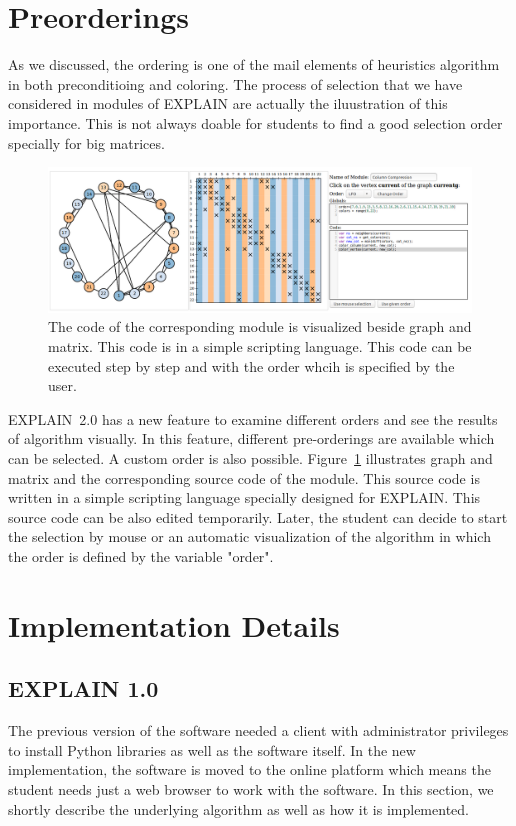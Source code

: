 \documentclass[12pt, oneside]{book}
\begin{document}
\section{Preorderings}
As we discussed, the ordering is one of the mail elements of heuristics algorithm
in both preconditioing and coloring. The process of selection that we have
considered in modules of \mbox{EXPLAIN} are actually the iluustration of this importance.
This is not always doable for students to find a good selection order specially for
big matrices.
\begin{figure}
\centering
\includegraphics[width=\textwidth]{custom_module}
\caption{The code of the corresponding module is visualized beside 
graph and matrix. This code is in a simple scripting language. 
This code can be executed step by step and with the order whcih
is specified by the user.}
\label{f.custom_module}
\end{figure}

\mbox{EXPLAIN 2.0} has a new feature to examine different orders 
and see the results of algorithm visually. In this feature, different
pre-orderings are available which can be selected. A custom order is 
also possible. Figure~\ref{f.custom_module} illustrates graph and matrix
and the corresponding source code of the module. This source code
is written in a simple scripting language specially designed for \mbox{EXPLAIN}.
This source code can be also edited temporarily. Later, the student can
decide to start the selection by mouse or an automatic visualization
of the algorithm in which the order is defined by the variable "order".

\section{Implementation Details}
\label{s.impl.explain}
\subsection{EXPLAIN 1.0}
\label{s.impl.explain1}
The previous version of the software \cite{Lulfesmann2010} needed a client with administrator privileges to install Python libraries as well as the software itself. In the new implementation, the software is moved to the online platform which means the student needs just a web browser to work with the software. In this section, we shortly describe the underlying algorithm as well as how it is implemented.
\end{document}
